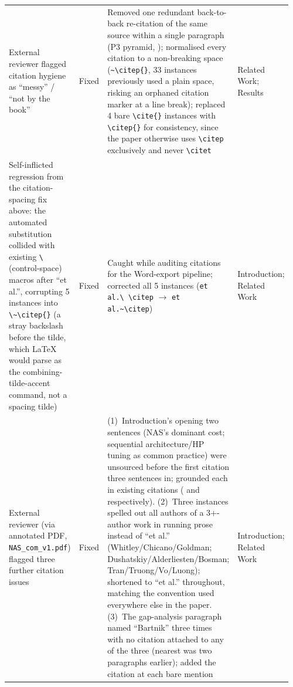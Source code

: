 \begin{longtable}{p{0.24\linewidth} p{0.08\linewidth} p{0.55\linewidth} p{0.09\linewidth}}
External reviewer flagged citation hygiene as ``messy'' / ``not by the book'' & Fixed & Removed one redundant back-to-back re-citation of the same source within a single paragraph (P3 pyramid, \citep{goldman2014parameterless}); normalised every citation to a non-breaking space (\texttt{\textasciitilde\textbackslash citep\{\}}, 33 instances previously used a plain space, risking an orphaned citation marker at a line break); replaced 4 bare \texttt{\textbackslash cite\{\}} instances with \texttt{\textbackslash citep\{\}} for consistency, since the paper otherwise uses \texttt{\textbackslash citep} exclusively and never \texttt{\textbackslash citet} & Related Work; Results \\
Self-inflicted regression from the citation-spacing fix above: the automated substitution collided with existing \texttt{\textbackslash\ } (control-space) macros after ``et al.'', corrupting 5 instances into \texttt{\textbackslash\textasciitilde\textbackslash citep\{\}} (a stray backslash before the tilde, which LaTeX would parse as the combining-tilde-accent command, not a spacing tilde) & Fixed & Caught while auditing citations for the Word-export pipeline; corrected all 5 instances (\texttt{et al.\textbackslash\ \textbackslash citep} $\rightarrow$ \texttt{et al.\textasciitilde\textbackslash citep}) & Introduction; Related Work \\
External reviewer (via annotated PDF, \texttt{NAS\_com\_v1.pdf}) flagged three further citation issues & Fixed & (1)~Introduction's opening two sentences (NAS's dominant cost; sequential architecture/HP tuning as common practice) were unsourced before the first citation three sentences in; grounded each in existing citations (\citep{white2023insights,liu2023survey} and \citep{lu2019nsganet,lu2020nsganetv2} respectively). (2)~Three instances spelled out all authors of a 3+-author work in running prose instead of ``et al.'' (Whitley/Chicano/Goldman; Dushatskiy/Alderliesten/Bosman; Tran/Truong/Vo/Luong); shortened to ``et al.'' throughout, matching the convention used everywhere else in the paper. (3)~The gap-analysis paragraph named ``Bartnik'' three times with no citation attached to any of the three (nearest \citep{bartnik2026evolutionary} was two paragraphs earlier); added the citation at each bare mention & Introduction; Related Work \\
\bottomrule
\end{longtable}

\twocolumn
